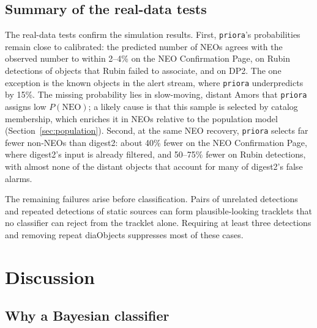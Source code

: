 \documentclass[linenumbers,twocolumn]{aastex701}
\newcommand{\priora}{{\tt priora}\xspace} %
\begin{document}
\subsection{Summary of the real-data tests}
\label{sec:rubinsummary}

The real-data tests confirm the simulation results. First, \priora's
probabilities remain close to calibrated: the predicted number of NEOs
agrees with the observed number to within 2--4\% on the NEO Confirmation
Page, on Rubin detections of objects that Rubin failed to associate, and on
DP2. The one exception is the known objects in the alert stream, where
\priora underpredicts by 15\%. The missing probability lies in slow-moving, distant
Amors that \priora assigns low $P(\mathrm{NEO})$; a likely cause is that this
sample is selected by catalog membership, which enriches it in NEOs
relative to the population model (Section~\ref{sec:population}). Second, at the same NEO
recovery, \priora selects far fewer non-NEOs than digest2: about 40\% fewer
on the NEO Confirmation Page, where digest2's input is already filtered,
and 50--75\% fewer on Rubin detections, with almost none of the distant
objects that account for many of digest2's false alarms.

The remaining failures arise before classification. Pairs of unrelated
detections and repeated detections of static sources can form
plausible-looking tracklets that no classifier can reject from the tracklet
alone. Requiring at least three detections and removing repeat diaObjects
suppresses most of these cases.









\section{Discussion}
\label{sec:discussion}

\subsection{Why a Bayesian classifier}
\label{sec:bayes}
\end{document}
